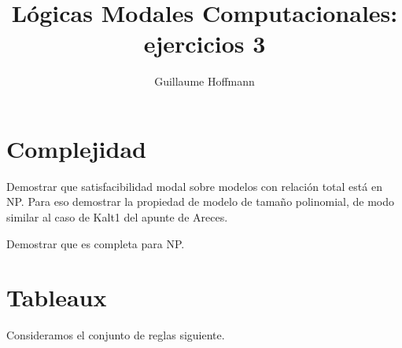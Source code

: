 \documentclass[10pt]{article}
\begin{document}
\title{Lógicas Modales Computacionales: ejercicios 3}
\author{Guillaume Hoffmann}

\maketitle

\section{Complejidad}

Demostrar que satisfacibilidad modal sobre modelos con relaci\'on total est\'a en NP.
Para eso demostrar la propiedad de modelo de tama\~no polinomial, de modo similar
al caso de Kalt1 del apunte de Areces.

Demostrar que es completa para NP.

\section{Tableaux}

Consideramos el conjunto de reglas siguiente.
\end{document}
